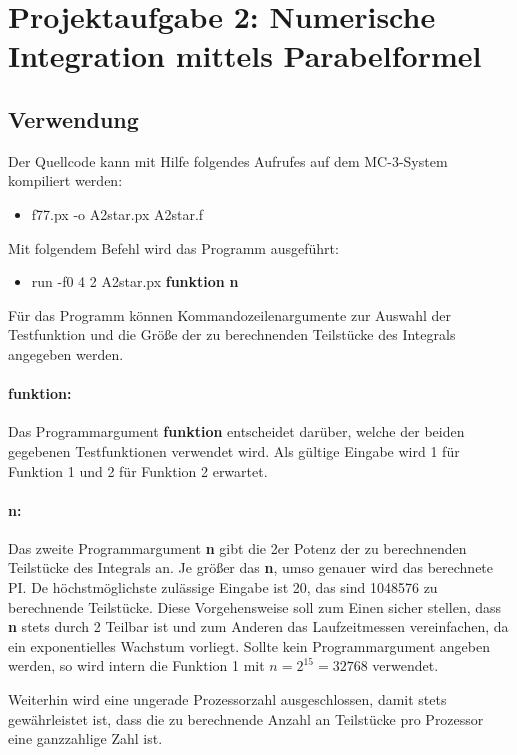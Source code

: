 \pagebreak

\section{Projektaufgabe 2: Numerische Integration mittels Parabelformel}
\lstset{language=Fortran,frame=none, keepspaces=false, basicstyle=\footnotesize,showstringspaces=false}  

\subsection{Verwendung}
Der Quellcode kann mit Hilfe folgendes Aufrufes auf dem MC-3-System kompiliert werden:
\begin{itemize}
	\item f77.px -o A2star.px A2star.f
\end{itemize}
Mit folgendem Befehl wird das Programm ausgeführt:
\begin{itemize}
	\item run -f0 4 2 A2star.px \textbf{funktion} \textbf{n}
\end{itemize}

Für das Programm können Kommandozeilenargumente zur Auswahl der Testfunktion und die Größe der zu berechnenden Teilstücke des Integrals angegeben werden.
\paragraph{funktion:}
Das Programmargument \textbf{funktion} entscheidet darüber, welche der beiden gegebenen Testfunktionen verwendet wird.
Als gültige Eingabe wird 1 für Funktion 1 und 2 für Funktion 2 erwartet.
\paragraph{n:}
Das zweite Programmargument \textbf{n} gibt die 2er Potenz der zu berechnenden Teilstücke des Integrals an.
Je größer das \textbf{n}, umso genauer wird das berechnete PI.
De höchstmöglichste zulässige Eingabe ist 20, das sind 1048576 zu berechnende Teilstücke.
Diese Vorgehensweise soll zum Einen sicher stellen, dass \textbf{n} stets durch 2 Teilbar ist und zum Anderen das Laufzeitmessen vereinfachen, da ein exponentielles Wachstum vorliegt.
Sollte kein Programmargument angeben werden, so wird intern die Funktion 1 mit $n = 2^{15} = 32768$ verwendet.

Weiterhin wird eine ungerade Prozessorzahl ausgeschlossen, damit stets gewährleistet ist, dass die zu berechnende Anzahl an Teilstücke pro Prozessor eine ganzzahlige Zahl ist.


